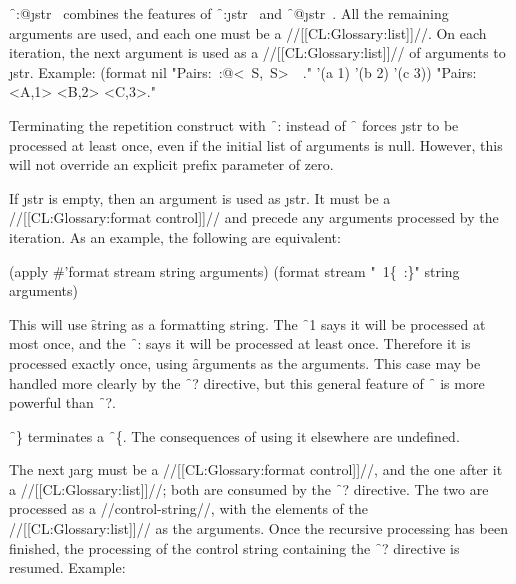 \f{~:@\lbr \j{str}~\rbr  }  combines the features                               of \f{~:\lbr \j{str}~\rbr  } and \f{~@\lbr \j{str}~\rbr  }. All the remaining arguments are used, and each one must be a //[[CL:Glossary:list]]//. On each iteration, the next argument is  used as a //[[CL:Glossary:list]]// of arguments to \j{str}. Example:
                                      \code
 (format nil "Pairs:~:@\lbr <~S,~S>~\rbr\ ." 
              '(a 1) '(b 2) '(c 3))  \EV "Pairs: <A,1> <B,2> <C,3>." \endcode

Terminating the repetition construct with \f{~:\rbr }  instead of \f{~\rbr  } forces \j{str} to be processed at least once, even if the initial list of arguments is null. However, this will not override an explicit prefix parameter of zero.

If \j{str} is empty, then an argument is used as \j{str}.   It must be a //[[CL:Glossary:format control]]// and precede any arguments processed by the iteration.  As an example, the following are equivalent:

\code
    (apply #'format stream string arguments)
 \EQ (format stream "~1\{~:\}" string arguments) \endcode

This will use \f{string} as a formatting string.   The \f{~1\lbr } says it will                  be processed at most once, and the \f{~:\rbr }  says it will be processed at least once. Therefore it is processed exactly once, using \f{arguments} as the arguments. This case may be handled more clearly by the \f{~?} directive, but this general feature of \f{~\lbr  } is more powerful than \f{~?}.

\endsubsubsection%

 

                                \f{~\}} terminates a \f{~\{}. The consequences of using it elsewhere are undefined.

\endsubsubsection%

 

The next \j{arg} must be a //[[CL:Glossary:format control]]//, and the one after it a //[[CL:Glossary:list]]//; both are consumed by the \f{~?} directive. The two are processed as a //control-string//, with the elements of the //[[CL:Glossary:list]]//  as the arguments.  Once the recursive processing has been finished, the processing of the control string containing the \f{~?} directive is resumed. Example:

